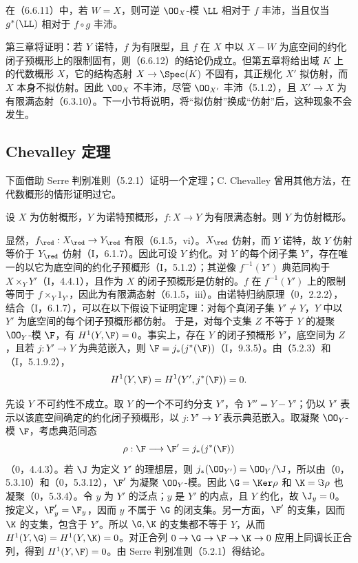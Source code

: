 在（6.6.11）中，若 $W=X$，则可逆 $\OO_X$-模 $\LL$ 相对于 $f$ 丰沛，当且仅当 $g^*(\LL)$ 相对于 $f\circ g$ 丰沛。

第三章将证明：若 $Y$ 诺特，$f$ 为有限型，且 $f$ 在 $X$ 中以 $X-W$ 为底空间的约化闭子预概形上的限制固有，则（6.6.12）的结论仍成立。但第五章将给出域 $K$ 上的代数概形 $X$，它的结构态射 $X\to\Spec(K)$ 不固有，其正规化 $X'$ 拟仿射，而 $X$ 本身不拟仿射。因此 $\OO_X$ 不丰沛，尽管 $\OO_{X'}$ 丰沛（5.1.2），且 $X'\to X$ 为有限满态射（6.3.10）。下一小节将说明，将“拟仿射”换成“仿射”后，这种现象不会发生。

\subsection{Chevalley 定理}
下面借助 Serre 判别准则（5.2.1）证明一个定理；C. Chevalley 曾用其他方法，在代数概形的情形证明过它。

设 $X$ 为仿射概形，$Y$ 为诺特预概形，$f:X\to Y$ 为有限满态射。则 $Y$ 为仿射概形。

显然，$f_{\red}:X_{\red}\to Y_{\red}$ 有限（6.1.5，vi）。$X_{\red}$ 仿射，而 $Y$ 诺特，故 $Y$ 仿射等价于 $Y_{\red}$ 仿射（I，6.1.7）。因此可设 $Y$ 约化。对 $Y$ 的每个闭子集 $Y'$，存在唯一的以它为底空间的约化子预概形（I，5.1.2）；其逆像 $f^{-1}(Y')$ 典范同构于 $X\times_Y Y'$（I，4.4.1），且作为 $X$ 的闭子预概形是仿射的。$f$ 在 $f^{-1}(Y')$ 上的限制等同于 $f\times_Y1_{Y'}$，因此为有限满态射（6.1.5，iii）。由诺特归纳原理（0，2.2.2），结合（I，6.1.7），可以在以下假设下证明定理：对每个真闭子集 $Y'\ne Y$，$Y$ 中以 $Y'$ 为底空间的每个闭子预概形都仿射。
于是，对每个支集 $Z$ 不等于 $Y$ 的凝聚 $\OO_Y$-模 $\F$，有 $H^1(Y,\F)=0$。事实上，存在 $Y$ 的闭子预概形 $Y'$，底空间为 $Z$，且若 $j:Y'\to Y$ 为典范嵌入，则 $\F=j_*(j^*(\F))$（I，9.3.5）。由（5.2.3）和（I，5.1.9.2），
\[
H^1(Y,\F)=H^1(Y',j^*(\F))=0.
\]

先设 $Y$ 不可约性不成立。取 $Y$ 的一个不可约分支 $Y'$，令 $Y''=Y-Y'$；仍以 $Y'$ 表示以该底空间确定的约化闭子预概形，以 $j:Y'\to Y$ 表示典范嵌入。取凝聚 $\OO_Y$-模 $\F$，考虑典范同态
\[
\rho:\F\longrightarrow\F'=j_*(j^*(\F))
\]
（0，4.4.3）。若 $\J$ 为定义 $Y'$ 的理想层，则 $j_*(\OO_{Y'})=\OO_Y/\J$，所以由（0，5.3.10）和（0，5.3.12），$\F'$ 为凝聚 $\OO_Y$-模。因此 $\G=\Ker\rho$ 和 $\K=\Im\rho$ 也凝聚（0，5.3.4）。令 $y$ 为 $Y'$ 的泛点；$y$ 是 $Y'$ 的内点，且 $Y$ 约化，故 $\J_y=0$。按定义，$\F'_y=\F_y$，因而 $y$ 不属于 $\G$ 的闭支集。另一方面，$\F'$ 的支集，因而 $\K$ 的支集，包含于 $Y'$。所以 $\G,\K$ 的支集都不等于 $Y$，从而
$H^1(Y,\G)=H^1(Y,\K)=0$。对正合列 $0\to\G\to\F\to\K\to0$ 应用上同调长正合列，得到 $H^1(Y,\F)=0$。由 Serre 判别准则（5.2.1）得结论。

